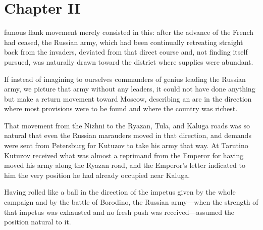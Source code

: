 
\chapter*{Chapter II} \ifaudio {}
\fi

 famous flank movement merely consisted in this: after the
advance of the French had ceased, the Russian army, which had
been continually retreating straight back from the invaders,
deviated from that direct course and, not finding itself pursued,
was naturally drawn toward the district where supplies were
abundant.

If instead of imagining to ourselves commanders of genius leading
the Russian army, we picture that army without any leaders, it
could not have done anything but make a return movement toward
Moscow, describing an arc in the direction where most provisions
were to be found and where the country was richest.

That movement from the Nizhni to the Ryazan, Tula, and Kaluga
roads was so natural that even the Russian marauders moved in
that direction, and demands were sent from Petersburg for Kutuzov
to take his army that way.  At Tarutino Kutuzov received what was
almost a reprimand from the Emperor for having moved his army
along the Ryazan road, and the Emperor's letter indicated to him
the very position he had already occupied near Kaluga.

Having rolled like a ball in the direction of the impetus given
by the whole campaign and by the battle of Borodino, the Russian
army---when the strength of that impetus was exhausted and no
fresh push was received---assumed the position natural to it.

